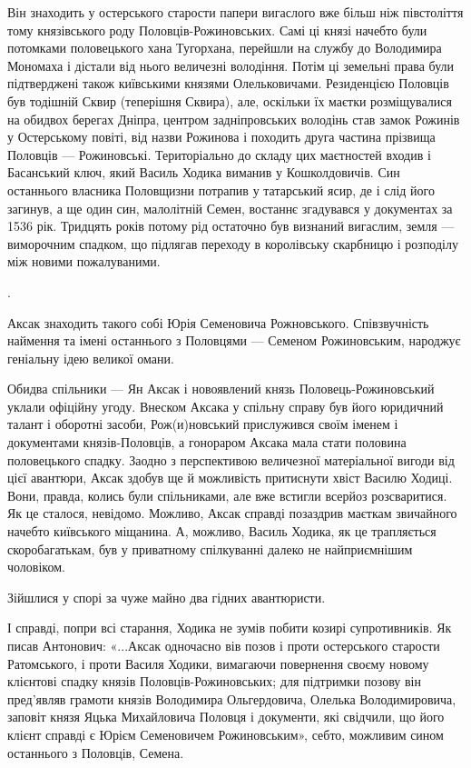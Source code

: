 Він знаходить у остерського старости папери вигаслого вже більш ніж півстоліття
тому князівського роду Половців-Рожиновських. Самі ці князі начебто були
потомками половецького хана Тугорхана, перейшли на службу до Володимира
Мономаха і дістали від нього величезні володіння. Потім ці земельні права були
підтверджені також київськими князями Олельковичами. Резиденцією Половців був
тодішній Сквир (теперішня Сквира), але, оскільки їх маєтки розміщувалися на
обидвох берегах Дніпра, центром задніпровських володінь став замок Рожинів у
Остерському повіті, від назви Рожинова і походить друга частина прізвища
Половців — Рожиновські. Територіально до складу цих маєтностей входив і
Басанський ключ, який Василь Ходика виманив у Кошколдовичів. Син останнього
власника Половщизни потрапив у татарський ясир, де і слід його загинув, а ще
один син, малолітній Семен, востаннє згадувався у документах за 1536 рік.
Тридцять років потому рід остаточно був визнаний вигаслим, земля — виморочним
спадком, що підлягав переходу в королівську скарбницю і розподілу між новими
пожалуваними. 

.

Аксак знаходить такого собі Юрія Семеновича Рожновського. Співзвучність
наймення та імені останнього з Половцями — Семеном Рожиновським, народжує
геніальну ідею великої омани. 

Обидва спільники — Ян Аксак і новоявлений князь Половець-Рожиновський уклали
офіційну угоду. Внеском Аксака у спільну справу був його юридичний талант і
оборотні засоби, Рож(и)новський прислужився своїм іменем і документами
князів-Половців, а гонораром Аксака мала стати половина половецького спадку.
Заодно з перспективою величезної матеріальної вигоди від цієї авантюри, Аксак
здобув ще й можливість притиснути хвіст Василю Ходиці. Вони, правда, колись
були спільниками, але вже встигли всерйоз розсваритися. Як це сталося,
невідомо. Можливо, Аксак справді позаздрив маєткам звичайного начебто
київського міщанина. А, можливо, Василь Ходика, як це трапляється
скоробагатькам, був у приватному спілкуванні далеко не найприємнішим чоловіком.

Зійшлися у спорі за чуже майно два гідних авантюристи. 

І справді, попри всі старання, Ходика не зумів побити козирі супротивників. Як
писав Антонович: «...Аксак одночасно вів позов і проти остерського старости
Ратомського, і проти Василя Ходики, вимагаючи повернення своєму новому
клієнтові спадку князів Половців-Рожиновських; для підтримки позову він
пред’являв грамоти князів Володимира Ольгердовича, Олелька Володимировича,
заповіт князя Яцька Михайловича Половця і документи, які свідчили, що його
клієнт справді є Юрієм Семеновичем Рожиновським», себто, можливим сином
останнього з Половців, Семена. 

